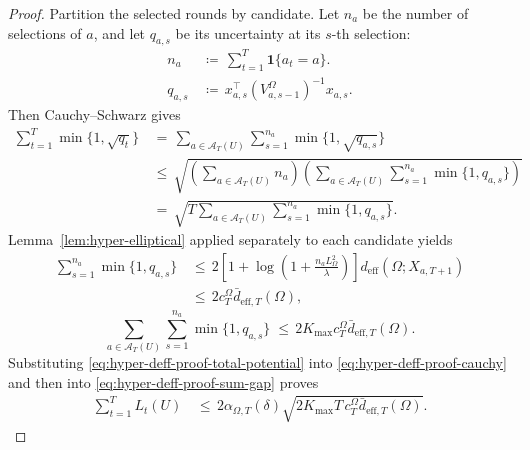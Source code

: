 \documentclass{article} %
\begin{document}
\begin{proof}
Partition the selected rounds by candidate. Let \(n_a\) be the number of
selections of \(a\), and let \(q_{a,s}\) be its uncertainty at its \(s\)-th
selection:
\begin{align}
n_a
&\,\coloneqq\,
\sum_{t=1}^{T}\mathbf{1}\{a_t=a\}.
\label{eq:hyper-deff-proof-na}
\\
q_{a,s}
&\,\coloneqq\,
x_{a,s}^\top
\left(V_{a,s-1}^{\Omega}\right)^{-1}
x_{a,s}.
\label{eq:hyper-deff-proof-qas}
\end{align}
Then Cauchy--Schwarz gives
\begin{equation}
\label{eq:hyper-deff-proof-cauchy}
\begin{aligned}
\sum_{t=1}^{T}
\min\{1,\sqrt{q_t}\}
&\,=\,
\sum_{a\in\mathcal A_T(U)}
\sum_{s=1}^{n_a}
\min\{1,\sqrt{q_{a,s}}\}
\\
&\,\leq\,
\sqrt{
\left(
\sum_{a\in\mathcal A_T(U)}n_a
\right)
\left(
\sum_{a\in\mathcal A_T(U)}
\sum_{s=1}^{n_a}
\min\{1,q_{a,s}\}
\right)
}
\\
&\,=\,
\sqrt{
T
\sum_{a\in\mathcal A_T(U)}
\sum_{s=1}^{n_a}
\min\{1,q_{a,s}\}
}.
\end{aligned}
\end{equation}
Lemma~\ref{lem:hyper-elliptical} applied separately to each candidate yields
\begin{equation}
\label{eq:hyper-deff-proof-elliptical-per-arm}
\begin{aligned}
\sum_{s=1}^{n_a}
\min\{1,q_{a,s}\}
&\,\leq\,
2
\left[
1+\log\!\left(1+\frac{n_aL_{\Omega}^{2}}{\lambda}\right)
\right]
d_{\mathrm{eff}}(\Omega;X_{a,T+1})
\\
&\,\leq\,
2c_T^\Omega\bar d_{\mathrm{eff},T}(\Omega),
\end{aligned}
\end{equation}
\begin{equation}
\label{eq:hyper-deff-proof-total-potential}
\sum_{a\in\mathcal A_T(U)}
\sum_{s=1}^{n_a}
\min\{1,q_{a,s}\}
\;\leq\,
2K_{\max}c_T^\Omega
\bar d_{\mathrm{eff},T}(\Omega).
\end{equation}
Substituting \eqref{eq:hyper-deff-proof-total-potential} into \eqref{eq:hyper-deff-proof-cauchy} and then into \eqref{eq:hyper-deff-proof-sum-gap} proves
\begin{equation}
\label{eq:hyper-deff-proof-pathwise}
\begin{aligned}
\sum_{t=1}^{T}L_t(U)
&\,\leq\,
2\alpha_{\Omega,T}(\delta)
\sqrt{
2K_{\max}T\,c_T^\Omega
\bar d_{\mathrm{eff},T}(\Omega)
}.
\end{aligned}
\end{equation}

\end{proof}
\end{document}
